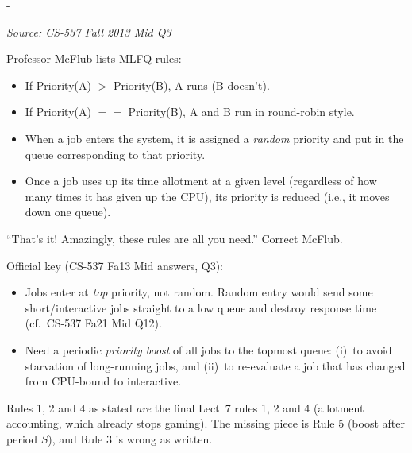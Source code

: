 \documentclass[11pt,a4paper]{article}
\makeatletter
\newcommand{\keepspace}[1]{\par\penalty-100\begingroup
  \setlength{\dimen@}{#1}\dimen@ii\pagegoal\advance\dimen@ii-\pagetotal
  \ifdim\dimen@>\dimen@ii\ifdim\dimen@ii>\z@\vfil\fi\break\fi\endgroup}
\newcounter{qn}[section]
\newenvironment{Qn}[4]{%
  \refstepcounter{qn}\keepspace{7\baselineskip}%
  \begin{tcolorbox}[qboxstyle, title={Q\thesection.\theqn\ \ [#1 \textbar\ #2]\ \ #4}]%
  {\footnotesize\color{g3}\textit{Source: #3}}\par\smallskip%
}{%
  \end{tcolorbox}%
}
\newenvironment{Sol}{%
  \begin{tcolorbox}[sboxstyle, title={Solution}]%
}{%
  \end{tcolorbox}\vspace{0.35em}%
}
\makeatother
\begin{document}
\begin{Qn}{Hard}{Lect 7}{CS-537 Fall 2013 Mid Q3}{McFlub's MLFQ rules (random entry, no boost)}
Professor McFlub lists MLFQ rules:
\begin{itemize}
  \item If Priority(A) $>$ Priority(B), A runs (B doesn't).
  \item If Priority(A) $==$ Priority(B), A and B run in round-robin style.
  \item When a job enters the system, it is assigned a \emph{random} priority and put in the queue corresponding to that priority.
  \item Once a job uses up its time allotment at a given level (regardless of how many times it has given up the CPU), its priority is reduced (i.e., it moves down one queue).
\end{itemize}
``That's it! Amazingly, these rules are all you need.'' Correct McFlub.
\end{Qn}
\begin{Sol}
Official key (CS-537 Fa13 Mid answers, Q3):
\begin{itemize}
  \item Jobs enter at \emph{top} priority, not random. Random entry would send some short/interactive jobs straight to a low queue and destroy response time (cf.\ CS-537 Fa21 Mid Q12).
  \item Need a periodic \emph{priority boost} of all jobs to the topmost queue: (i)~to avoid starvation of long-running jobs, and (ii)~to re-evaluate a job that has changed from CPU-bound to interactive.
\end{itemize}
Rules 1, 2 and 4 as stated \emph{are} the final Lect~7 rules 1, 2 and 4 (allotment accounting, which already stops gaming). The missing piece is Rule 5 (boost after period $S$), and Rule 3 is wrong as written.
\end{Sol}
\end{document}
